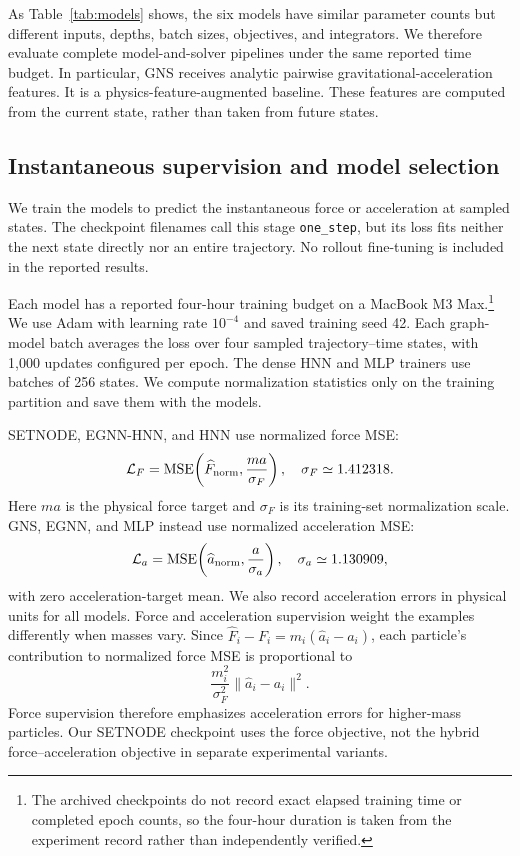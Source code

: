 \documentclass[10pt,letterpaper,twocolumn]{article}
\newcommand{\MSE}{\operatorname{MSE}}
\newcommand{\Fhat}{\widehat F}
\newcommand{\ahat}{\widehat a}
\newcommand{\norm}[1]{\lVert #1\rVert}
\numberwithin{equation}{section}
\begin{document}
As Table~\ref{tab:models} shows, the six models have similar parameter counts but different inputs,
depths, batch sizes, objectives, and integrators. We therefore evaluate complete model-and-solver
pipelines under the same reported time budget.
In particular, GNS receives analytic pairwise gravitational-acceleration features. It is a
physics-feature-augmented baseline. These features are computed from the current state, rather than taken from future states.

\subsection{Instantaneous supervision and model selection}

We train the models to predict the instantaneous force or acceleration at sampled states. The
checkpoint filenames call this stage \texttt{one\_step}, but its loss fits neither the next state
directly nor an entire trajectory. No rollout fine-tuning is included in the reported results.

Each model has a reported four-hour training budget on a MacBook M3 Max.\footnote{The archived checkpoints do not record exact elapsed training time or completed epoch counts, so the four-hour duration is taken from the experiment record rather than independently verified.}
We use Adam with learning rate $10^{-4}$ and saved training seed 42. Each graph-model batch
averages the loss over four sampled trajectory--time states, with 1,000 updates configured per
epoch. The dense HNN and MLP trainers use batches of 256 states. We compute normalization
statistics only on the training partition and save them with the models.

SETNODE, EGNN-HNN, and HNN use normalized force MSE:
\begin{equation}
\mathcal L_F=\MSE\!\left(\Fhat_{\rm norm},\frac{ma}{\sigma_F}\right),
\quad \sigma_F\simeq1.412318.
\label{eq:force_loss}
\end{equation}
Here $ma$ is the physical force target and $\sigma_F$ is its training-set normalization scale.
GNS, EGNN, and MLP instead use normalized acceleration MSE:
\begin{equation}
\mathcal L_a=\MSE\!\left(\ahat_{\rm norm},\frac{a}{\sigma_a}\right),
\quad \sigma_a\simeq1.130909,
\label{eq:acc_loss}
\end{equation}
with zero acceleration-target mean. We also record acceleration errors in physical units for all
models. Force and acceleration supervision weight the examples differently when masses vary.
Since $\Fhat_i-F_i=m_i(\ahat_i-a_i)$, each particle's contribution to normalized force MSE is
proportional to
\begin{equation}
\frac{m_i^2}{\sigma_F^2}\norm{\ahat_i-a_i}^2.
\label{eq:massweight}
\end{equation}
Force supervision therefore emphasizes acceleration errors for higher-mass particles. Our SETNODE
checkpoint uses the force objective, not the hybrid force--acceleration objective in separate
experimental variants.
\end{document}
